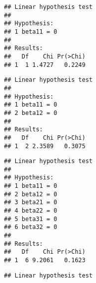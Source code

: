 \begin{knitrout}
\color{fgcolor}\begin{kframe}
\begin{alltt}
\hlstd{(} 
                      \hlstd{=} \hlstd{(}\hlstd{))}
\end{alltt}
\begin{verbatim}
## Linear hypothesis test
## 
## Hypothesis:            
## 1 beta11 = 0
## 
## Results:
##   Df    Chi Pr(>Chi)
## 1  1 1.4727   0.2249
\end{verbatim}
\begin{alltt}
\hlstd{(} 
                      \hlstd{=} \hlstd{(}\hlstd{,}
                                    \hlstd{))}
\end{alltt}
\begin{verbatim}
## Linear hypothesis test
## 
## Hypothesis:            
## 1 beta11 = 0
## 2 beta12 = 0
## 
## Results:
##   Df    Chi Pr(>Chi)
## 1  2 2.3589   0.3075
\end{verbatim}
\begin{alltt}
\hlstd{(} 
                      \hlstd{=} \hlstd{(}\hlstd{,}
                                    \hlstd{,}
                                    \hlstd{,}
                                    \hlstd{,}
                                    \hlstd{,}
                                    \hlstd{))}
\end{alltt}
\begin{verbatim}
## Linear hypothesis test
## 
## Hypothesis:            
## 1 beta11 = 0
## 2 beta12 = 0
## 3 beta21 = 0
## 4 beta22 = 0
## 5 beta31 = 0
## 6 beta32 = 0
## 
## Results:
##   Df    Chi Pr(>Chi)
## 1  6 9.2061   0.1623
\end{verbatim}
\begin{alltt}
\hlstd{(} 
                      \hlstd{=} \hlstd{(}\hlstd{))}
\end{alltt}
\begin{verbatim}
## Linear hypothesis test

\end{verbatim}
\end{kframe}
\end{knitrout}
